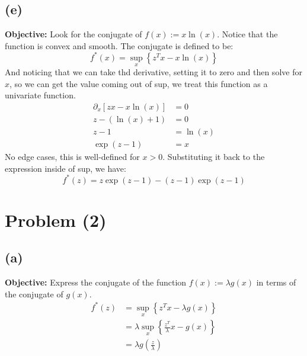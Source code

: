 \documentclass[]{article}
\begin{document}
    \subsection*{(e)}
        \textbf{Objective: }Look for the conjugate of $f(x):= x\ln(x)$. Notice that the function is convex and smooth. The conjugate is defined to be: 
        $$
        f^*(x) = \sup_x \left\lbrace
        z^Tx - x\ln(x)
        \right\rbrace
        $$
        And noticing that we can take thd derivative, setting it to zero and then solve for $x$, so we can get the value coming out of sup, we treat this function as a univariate function. 
        \begin{align*}\tag{1e1}\label{eqn:1e1}
            \partial_x[zx - x\ln(x)] &= 0
            \\
            z - (\ln(x) + 1) &= 0
            \\
            z - 1 &= \ln(x)
            \\
            \exp(z - 1) &= x
        \end{align*}
        No edge cases, this is well-defined for $x > 0$. 
        Substituting it back to the expression inside of sup, we have: 
        $$
        f^*(z) = z\exp(z - 1) - (z - 1)\exp(z - 1)
        $$
\section*{Problem (2)}
    \subsection*{(a)}
        \textbf{Objective: }Express the conjugate of the function $f(x):= \lambda g(x)$ in terms of the conjugate of $g(x)$. 
        \begin{align*}\tag{2a1}\label{eqn:2a1}
        f^*(z) &= \sup_x \left\lbrace
            z^Tx - \lambda g(x)
        \right\rbrace
        \\
        &= \lambda \sup_x \left\lbrace
            \frac{z^T}{\lambda}x - g(x)
        \right\rbrace
        \\ 
        &= \lambda g \left(
            \frac{z}{\lambda}
        \right)
        \end{align*}
\end{document}
